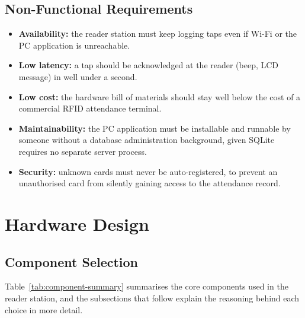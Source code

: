 \subsection{Non-Functional Requirements}
\begin{itemize}
    \item \textbf{Availability:} the reader station must keep logging taps even if Wi-Fi or the PC application is unreachable.
    \item \textbf{Low latency:} a tap should be acknowledged at the reader (beep, LCD message) in well under a second.
    \item \textbf{Low cost:} the hardware bill of materials should stay well below the cost of a commercial RFID attendance terminal.
    \item \textbf{Maintainability:} the PC application must be installable and runnable by someone without a database administration background, given SQLite requires no separate server process.
    \item \textbf{Security:} unknown cards must never be auto-registered, to prevent an unauthorised card from silently gaining access to the attendance record.
\end{itemize}

\section{Hardware Design}
\label{sec:hardware-design}

\subsection{Component Selection}

Table~\ref{tab:component-summary} summarises the core components used in the reader station, and the subsections that follow explain the reasoning behind each choice in more detail.

